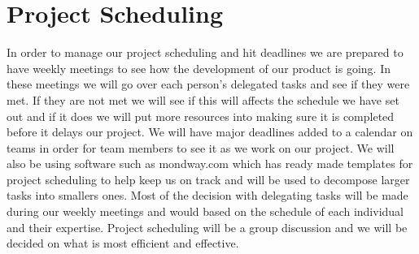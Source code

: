 \documentclass{article}
\begin{document}
\section{Project Scheduling}


In order to manage our project scheduling and hit deadlines we are prepared to have weekly meetings to see how the development of our product is going. In these meetings we will go over each person's delegated tasks and see if they were met. If they are not met we will see if this will affects the schedule we have set out and if it does we will put more resources into making sure it is completed before it delays our project. We will have major deadlines added to a calendar on teams in order for team members to see it as we work on our project. We will also be using software such as mondway.com which has ready made templates for project scheduling to help keep us on track and will be used to decompose larger tasks into smallers ones. Most of the decision with delegating tasks will be made during our weekly meetings and would based on the schedule of each individual and their expertise. Project scheduling will be a group discussion and we will be decided on what is most efficient and effective.
\end{document}
